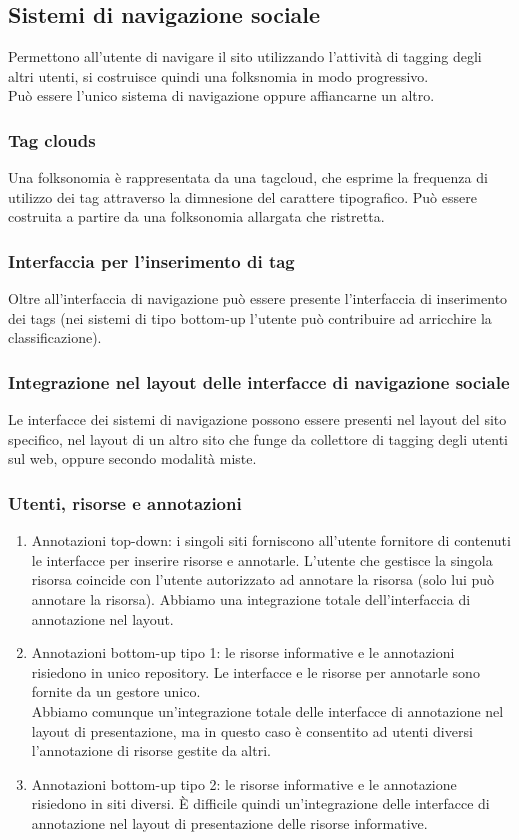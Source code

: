\documentclass{article}
\begin{document}
\subsection{Sistemi di navigazione sociale}
Permettono all'utente di navigare il sito utilizzando l'attività di tagging degli altri utenti, si costruisce quindi una folksnomia in modo progressivo.\\
Può essere l'unico sistema di navigazione oppure affiancarne un altro.
\subsubsection{Tag clouds}
Una folksonomia è rappresentata da una tagcloud, che esprime la frequenza di utilizzo dei tag attraverso la dimnesione del carattere tipografico. Può essere costruita a partire da una folksonomia allargata che ristretta. 
\subsubsection{Interfaccia per l'inserimento di tag}
Oltre all'interfaccia di navigazione può essere presente l'interfaccia di inserimento dei tags (nei sistemi di tipo bottom-up l'utente può contribuire ad arricchire la classificazione).
\subsubsection{Integrazione nel layout delle interfacce di navigazione sociale}
Le interfacce dei sistemi di navigazione possono essere presenti nel layout del sito specifico, nel layout di un altro sito che funge da collettore di tagging degli utenti sul web, oppure secondo modalità miste.
\subsubsection{Utenti, risorse e annotazioni}
\begin{enumerate}
	\item Annotazioni top-down: i singoli siti forniscono all'utente fornitore di contenuti le interfacce per inserire risorse e annotarle. L'utente che gestisce la singola risorsa coincide con l'utente autorizzato ad annotare la risorsa (solo lui può annotare la risorsa). Abbiamo una integrazione totale dell'interfaccia di annotazione nel layout.
	\item Annotazioni bottom-up tipo 1: le risorse informative e le annotazioni risiedono in unico repository. Le interfacce e le risorse per annotarle sono fornite da un gestore unico.\\
	Abbiamo comunque un'integrazione totale delle interfacce di annotazione nel layout di presentazione, ma in questo caso è consentito ad utenti diversi l'annotazione di risorse gestite da altri.
	\item Annotazioni bottom-up tipo 2: le risorse informative e le annotazione risiedono in siti diversi. È difficile quindi un'integrazione delle interfacce di annotazione nel layout di presentazione delle risorse informative.
\end{enumerate}
\end{document}
